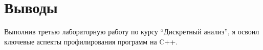 \section{Выводы}
Выполнив третью лабораторную работу по курсу \enquote{Дискретный анализ}, я освоил ключевые аспекты профилирования программ на C++.
\pagebreak
